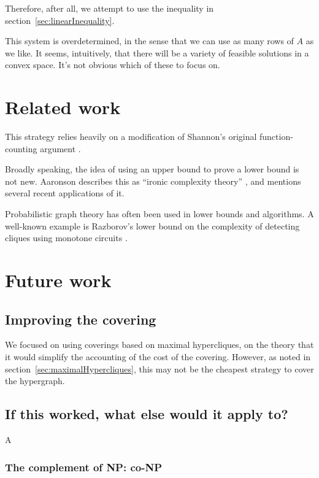 \documentclass[12pt]{article}
\theoremstyle{definition}
\begin{document}
Therefore, after all, we attempt to use the inequality in
section~\ref{sec:linearInequality}.

This system is overdetermined, in the sense that we can use as
many rows of $A$ as we like. It seems, intuitively,
that there will be a variety of feasible solutions in a convex space.
It's not obvious which of these to focus on.



\section{Related work}

This strategy relies heavily on a modification of Shannon's original
function-counting argument \cite{shannon_synthesis_1949}.

Broadly speaking, the idea of using an upper bound to prove a lower bound
is not new. Aaronson describes this as ``ironic complexity theory''
\cite{aaronson_pnp}, and mentions several recent applications of it.

Probabilistic graph theory has often been used in
lower bounds and algorithms. A well-known example is Razborov's lower
bound on the complexity of detecting cliques using monotone circuits
\cite{Razborov85lowerbounds}.

\section{Future work}

\subsection{Improving the covering}

We focused on using coverings based on maximal hypercliques, on
the theory that it would simplify the accounting of the cost of
the covering.
However, as noted in section~\ref{sec:maximalHypercliques}, this
may not be the cheapest strategy to cover the hypergraph.

\subsection{If this worked, what else would it apply to?}

A

\subsubsection{The complement of NP: co-NP}
\end{document}
